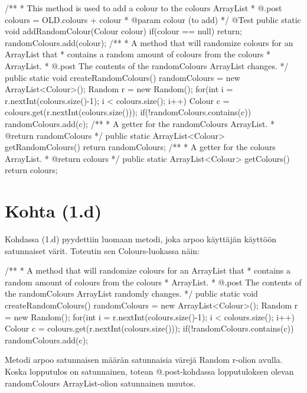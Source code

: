 \begin{javacode}
{{{		}
	}
	/**
	 * This method is used to add a colour to the colours ArrayList
	 * @.post colours = OLD.colours + colour
	 * @param colour (to add)
	 */
	@Test
	public static void addRandomColour(Colour colour){
		if(colour == null) return;
		randomColours.add(colour);
	}
	/**
	 * A method that will randomize colours for an ArrayList that
	 * contains a random amount of colours from the colours
	 * ArrayList.
	 * @.post The contents of the randomColours ArrayList changes.
	 */
	public static void createRandomColours() {
		randomColours = new ArrayList<Colour>();
		Random r = new Random();
		for(int i = r.nextInt(colours.size()-1);
		 i < colours.size(); i++) {
			Colour c =
			colours.get(r.nextInt(colours.size()));
			if(!randomColours.contains(c))
				randomColours.add(c);
		}
	}
	/**
	 * A getter for the randomColours ArrayList.
	 * @return randomColours
	 */
	public static ArrayList<Colour> getRandomColours(){
		return randomColours;
	}
	/**
	 * A getter for the colours ArrayList.
	 * @return colours
	 */
	public static ArrayList<Colour> getColours(){
		return colours;
	}
}
\end{javacode}

\pagebreak

\section{Kohta (1.d)}

\label{Kohta (1.d)}

Kohdassa (1.d) pyydettiin luomaan metodi, joka arpoo käyttäjän käyttöön satunnaiset värit. Toteutin sen Colours-luokassa näin:

\begin{javacode}
/**
 * A method that will randomize colours for an ArrayList that
 * contains a random amount of colours from the colours
 * ArrayList.
 * @.post The contents of the randomColours ArrayList randomly changes.
 */
public static void createRandomColours() {
	randomColours = new ArrayList<Colour>();
	Random r = new Random();
	for(int i = r.nextInt(colours.size()-1);
	 i < colours.size(); i++) {
		Colour c =
		colours.get(r.nextInt(colours.size()));
		if(!randomColours.contains(c))
			randomColours.add(c);
	}
}
\end{javacode}

Metodi arpoo satunnaisen määrän satunnaisia värejä Random r-olion avulla. Koska lopputulos on satunnainen, totean @.post-kohdassa lopputuloksen olevan randomColours ArrayList-olion satunnainen muutos.

